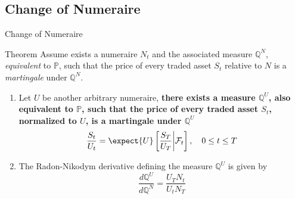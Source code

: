 \documentclass{beamer}
\begin{document}
\subsection{Change of Numeraire}
\begin{frame}{Change of Numeraire}
	\begin{block}{Theorem}
		Assume exists a numeraire $N_t$ and the associated measure $\mathbb{Q}^N$, \textit{equivalent} to $\mathbb{P}$, such that the price of every traded asset $S_t$ relative to $N$ is a \textit{martingale} under $\mathbb{Q}^N$.
		\begin{enumerate}
			\item Let $U$ be another arbitrary numeraire, \textbf{there exists a measure $\mathbb{Q}^U$, also equivalent to $\mathbb{P}$, such that the price of every traded asset $S_t$, normalized to $U$, is a martingale under $\mathbb{Q}^U$}
			\begin{equation*}
				\frac{S_t}{U_t} = \expect{U}\left[\frac{S_T}{U_T}\bigg|\mathcal{F}_t\right],\quad 0\le t \le T
			\end{equation*}
			\item The Radon-Nikodym derivative defining the measure $\mathbb{Q}^U$ is given by
			\begin{equation}
				\frac{d\mathbb{Q}^U}{d\mathbb{Q}^N} = \frac{U_T N_t}{U_t N_T}
				\label{eq:radon_nikodym_der2}
			\end{equation}
		\end{enumerate}
	\end{block}
\end{frame}
\end{document}
